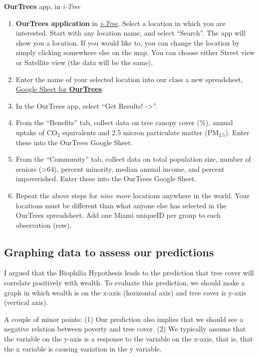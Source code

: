 \documentclass[
  letterpaper,
  DIV=11,
  numbers=noendperiod]{scrreprt}
\providecommand{\tightlist}{%
  \setlength{\itemsep}{0pt}\setlength{\parskip}{0pt}}
\begin{document}
\textbf{OurTrees} app, in \emph{i-Tree}

\begin{enumerate}
\def\labelenumi{\arabic{enumi}.}
\tightlist
\item
  \textbf{OurTrees application} in
  \href{https://www.itreetools.org/}{\emph{i-Tree}}. Select a location
  in which you are interested. Start with any location name, and select
  ``Search''. The app will show you a location. If you would like to,
  you can change the location by simply clicking somewhere else on the
  map. You can choose either Street view or Satellite view (the data
  will be the same).
\item
  Enter the name of your selected location into our class a new
  spreadsheet,
  \href{https://docs.google.com/spreadsheets/d/1uYCuTziJiLNvVOQ9Q65BxdWcNgDF6EnF8L1T3O_yATw/edit?usp=sharing}{Google
  Sheet for \textbf{OurTrees}}.
\item
  In the OurTrees app, select ``Get Results! -\textgreater{}''.
\item
  From the ``Benefits'' tab, collect data on tree canopy cover (\%),
  annual uptake of CO\(_2\) equivalents and 2.5 micron particulate
  matter (PM\(_{2.5}\)). Enter these into the OurTrees Google Sheet.
\item
  From the ``Community'' tab, collect data on total population size,
  number of seniors (\textgreater64), percent minority, median annual
  income, and percent impoverished. Enter these into the OurTrees Google
  Sheet.
\item
  Repeat the above steps for \emph{nine more} locations anywhere in the
  world. Your locations must be different than what anyone else has
  selected in the OurTrees spreadsheet. Add one Miami uniqueID per group
  to each observation (row).
\end{enumerate}

\subsection{Graphing data to assess our
predictions}\label{graphing-data-to-assess-our-predictions}

I argued that the Biophilia Hypothesis leads to the prediction that tree
cover will correlate positively with wealth. To evaluate this
prediction, we should make a graph in which wealth is on the x-axis
(horizontal axis) and tree cover is y-axis (vertical axis).

A couple of minor points: (1) Our prediction also implies that we should
see a negative relation between poverty and tree cover. (2) We typically
assume that the variable on the y-axis is a response to the variable on
the x-axis, that is, that the x variable is causing variation in the y
variable.
\end{document}
